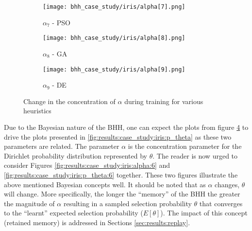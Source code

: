 \begin{figure}[htbp]
\begin{subfigure}{0.5\textwidth}
      \end{subfigure}
      \begin{subfigure}{0.5\textwidth}
            \centering
            \texttt{[image: bhh\_case\_study/iris/alpha[7].png]}
            \caption{$\alpha_{7}$ - \Acs{PSO}}
            \label{fig:results:case_study:iris:alpha:7}
      \end{subfigure}
      \par\bigskip
      \begin{subfigure}{0.5\textwidth}
            \centering
            \texttt{[image: bhh\_case\_study/iris/alpha[8].png]}
            \caption{$\alpha_{8}$ - \Acs{GA}}
            \label{fig:results:case_study:iris:alpha:8}
      \end{subfigure}
      \begin{subfigure}{0.5\textwidth}
            \centering
            \texttt{[image: bhh\_case\_study/iris/alpha[9].png]}
            \caption{$\alpha_{9}$ - \Acs{DE}}
            \label{fig:results:case_study:iris:alpha:9}
      \end{subfigure}
      \par\bigskip
      \caption{Change in the concentration of $\alpha$ during training for various heuristics}
      \label{fig:results:case_study:iris:alpha}
\end{figure}

Due to the Bayesian nature of the \Acs{BHH}, one can expect the plots from figure \ref{fig:results:case_study:iris:alpha} to drive the plots presented in \ref{fig:results:case_study:iris:p_theta} as these two parameters are related. The parameter $\alpha$ is the concentration parameter for the Dirichlet probability distribution represented by $\theta$. The reader is now urged to consider Figures \ref{fig:results:case_study:iris:alpha:6} and \ref{fig:results:case_study:iris:p_theta:6} together. These two figures illustrate the above mentioned Bayesian concepts well. It should be noted that as $\alpha$ changes, $\theta$ will change. More specifically, the longer the ``memory'' of the \Acs{BHH} the greater the magnitude of $\alpha$ resulting in a sampled selection probability $\theta$ that converges to the ``learnt'' expected selection probability ($E\left[\theta\right]$). The impact of this concept (retained memory) is addressed in Sections \ref{sec:results:replay}.

